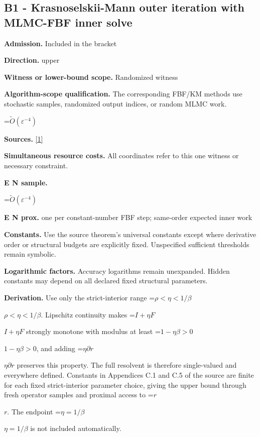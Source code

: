 \documentclass[10pt,a4paper]{article}
\newcommand{\AtlasMath}[1]{\par\begingroup\centering\setbox0=\hbox{$\displaystyle #1$}\ifdim\wd0>1.4\linewidth\typeout{ATLAS WIDE FORMULA: \the\wd0}\fi\ifdim\wd0>\linewidth\resizebox{\linewidth}{!}{\box0}\else\box0\fi\par\endgroup}
\newcommand{\AtlasInlineMath}[1]{\begingroup\setbox0=\hbox{$#1$}\ifdim\wd0>.4\linewidth\endgroup\AtlasMath{#1}\else\endgroup$#1$\fi}
\begin{document}
\subsection{B1 - Krasnoselskii-Mann outer iteration with MLMC-FBF inner solve}


\textbf{Admission.} Included in the bracket



\textbf{Direction.} upper



\textbf{Witness or lower-bound scope.} Randomized witness



\textbf{Algorithm-scope qualification.} The corresponding FBF/KM methods use stochastic samples, randomized output indices, or random MLMC work.



\AtlasMath{\widetilde{O}(\varepsilon^{-4})}


\textbf{Sources.} \href{https://raw.githubusercontent.com/mlresearch/v306/main/assets/alacaoglu26a/alacaoglu26a.pdf}{[1]}



\textbf{Simultaneous resource costs.} All coordinates refer to this one witness or necessary constraint.



\textbf{E N sample.}



\AtlasMath{\widetilde O(\varepsilon^{-4})}


\textbf{E N prox.} one per constant-number FBF step; same-order expected inner work



\textbf{Constants.} Use the source theorem’s universal constants except where derivative order or structural budgets are explicitly fixed. Unspecified sufficient thresholds remain symbolic.



\textbf{Logarithmic factors.} Accuracy logarithms remain unexpanded. Hidden constants may depend on all declared fixed structural parameters.



\textbf{Derivation.} Use only the strict-interior range \AtlasInlineMath{\rho<\eta<1/\beta}. Lipschitz continuity makes \AtlasInlineMath{I+\eta F} strongly monotone with modulus at least \AtlasInlineMath{1-\eta\beta>0}, and adding \AtlasInlineMath{\eta\partial r} preserves this property. The full resolvent is therefore single-valued and everywhere defined. Constants in Appendices C.1 and C.5 of the source are finite for each fixed strict-interior parameter choice, giving the upper bound through fresh operator samples and proximal access to \AtlasInlineMath{r}. The endpoint \AtlasInlineMath{\eta=1/\beta} is not included automatically.
\end{document}
